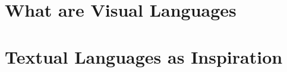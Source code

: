 \documentclass[twocolumn]{book}
\begin{document}
\chapter{What are Visual Languages}

\chapter{Textual Languages as Inspiration}
\end{document}
